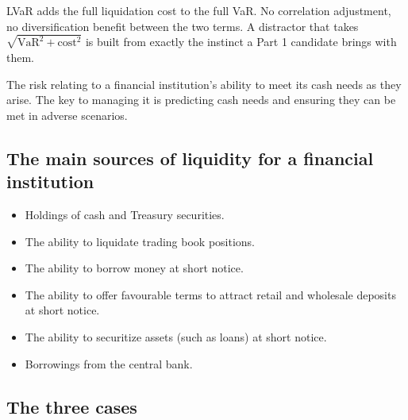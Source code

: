 \begin{lrtrapbox}
LVaR adds the full liquidation cost to the full VaR. No correlation adjustment, no diversification benefit between the two terms. A distractor that takes $\sqrt{\text{VaR}^2 + \text{cost}^2}$ is built from exactly the instinct a Part 1 candidate brings with them.
\end{lrtrapbox}


\begin{lrdefbox}
The risk relating to a financial institution's ability to meet its cash needs as they arise. The key to managing it is predicting cash needs and ensuring they can be met in adverse scenarios.
\end{lrdefbox}

\subsection{The main sources of liquidity for a financial institution}

\begin{itemize}
\item Holdings of cash and Treasury securities.
\item The ability to liquidate trading book positions.
\item The ability to borrow money at short notice.
\item The ability to offer favourable terms to attract retail and wholesale deposits at short notice.
\item The ability to securitize assets (such as loans) at short notice.
\item Borrowings from the central bank.
\end{itemize}

\subsection{The three cases}

